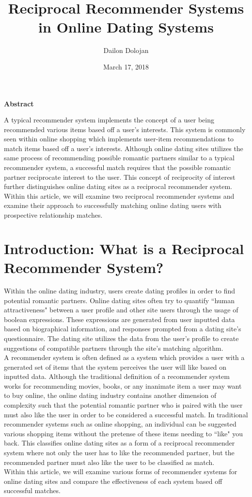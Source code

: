 \documentclass[11pt]{article}
\title{Reciprocal Recommender Systems in Online Dating Systems}
\author[1]{Dailon Dolojan}
\affil[1]{Department of Computer Science, University of California Santa Cruz, Santa Cruz}
\date{March 17, 2018}
\begin{document}
\maketitle
\begin{center}
    \textbf{Abstract}
\end{center}

\indent A typical recommender system implements the concept of a user being recommended various items based off a user's interests. This system is commonly seen within online shopping which implements user-item recommendations to match items based off a user's interests. Although online dating sites utilizes the same process of recommending possible romantic partners similar to a typical recommender system, a successful match requires that the possible romantic partner reciprocate interest to the user. This concept of reciprocity of interest further distinguishes online dating sites as a reciprocal recommender system. Within this article, we will examine two reciprocal recommender systems and examine their approach to successfully matching online dating users with prospective relationship matches.
\pagebreak

\section{Introduction: What is a Reciprocal Recommender System?}

\indent Within the online dating industry, users create dating profiles in order to find potential romantic partners. Online dating sites often try to quantify ``human attractiveness" between a user profile and other site users through the usage of boolean expressions. These expressions are generated from user inputted data based on biographical information, and responses prompted from a dating site's questionnaire. The dating site utilizes the data from the user's profile to create suggestions of compatible partners through the site's matching algorithm.\\
\indent A recommender system is often defined as a system which provides a user with a generated set of items that the system perceives the user will like based on inputted data. Although the traditional definition of a recommender system works for recommending movies, books, or any inanimate item a user may want to buy online, the online dating industry contains another dimension of complexity such that the potential romantic partner who is paired with the user must also like the user in order to be considered a successful match. In traditional recommender systems such as online shopping, an individual can be suggested various shopping items without the pretense of these items needing to ``like" you back. This classifies online dating sites as a form of a reciprocal recommender system where not only the user has to like the recommended partner, but the recommended partner must also like the user to be classified as match.\\
\indent 
Within this article, we will examine various forms of recommender systems for online dating sites and compare the effectiveness of each system based off successful matches. 
\end{document}
